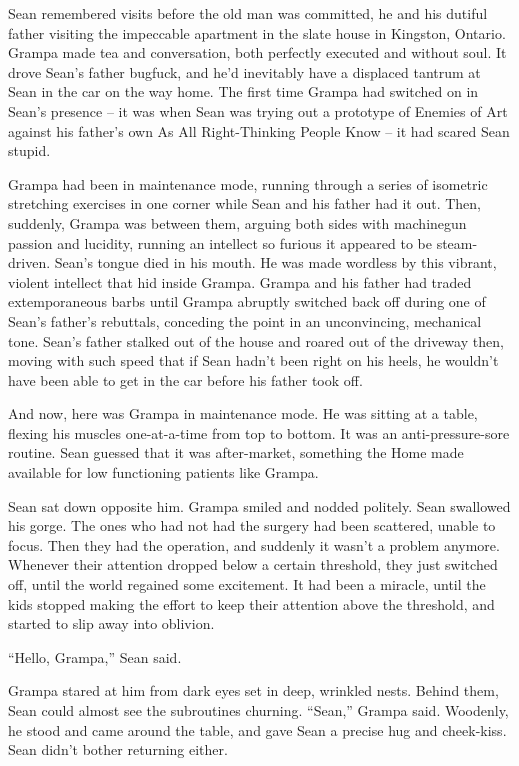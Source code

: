 Sean remembered visits before the old man was committed, he and his 
dutiful father visiting the impeccable apartment in the slate house in 
Kingston, Ontario. Grampa made tea and conversation, both perfectly 
executed and without soul. It drove Sean's father bugfuck, and he'd 
inevitably have a displaced tantrum at Sean in the car on the way home. 
The first time Grampa had switched on in Sean's presence -- it was when 
Sean was trying out a prototype of Enemies of Art against his father's 
own As All Right-Thinking People Know -- it had scared Sean stupid.

Grampa had been in maintenance mode, running through a series of 
isometric stretching exercises in one corner while Sean and his father 
had it out. Then, suddenly, Grampa was between them, arguing both sides 
with machinegun passion and lucidity, running an intellect so furious 
it appeared to be steam-driven. Sean's tongue died in his mouth. He was 
made wordless by this vibrant, violent intellect that hid inside 
Grampa. Grampa and his father had traded extemporaneous barbs until 
Grampa abruptly switched back off during one of Sean's father's 
rebuttals, conceding the point in an unconvincing, mechanical tone. 
Sean's father stalked out of the house and roared out of the driveway 
then, moving with such speed that if Sean hadn't been right on his 
heels, he wouldn't have been able to get in the car before his father 
took off.

And now, here was Grampa in maintenance mode. He was sitting at a 
table, flexing his muscles one-at-a-time from top to bottom. It was an 
anti-pressure-sore routine. Sean guessed that it was after-market, 
something the Home made available for low functioning patients like 
Grampa.

Sean sat down opposite him. Grampa smiled and nodded politely. Sean 
swallowed his gorge. The ones who had not had the surgery had been 
scattered, unable to focus. Then they had the operation, and suddenly 
it wasn't a problem anymore. Whenever their attention dropped below a 
certain threshold, they just switched off, until the world regained 
some excitement. It had been a miracle, until the kids stopped making 
the effort to keep their attention above the threshold, and started to 
slip away into oblivion.

“Hello, Grampa,” Sean said.

Grampa stared at him from dark eyes set in deep, wrinkled nests. Behind 
them, Sean could almost see the subroutines churning. “Sean,” 
Grampa said. Woodenly, he stood and came around the table, and gave 
Sean a precise hug and cheek-kiss. Sean didn't bother returning either.

